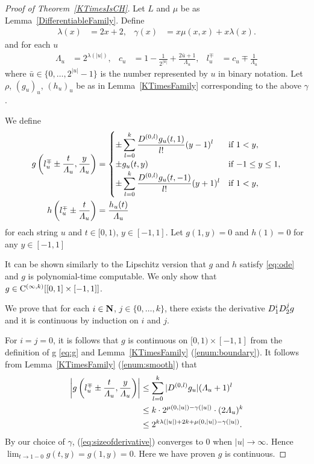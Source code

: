 \begin{proof}[Proof of Theorem~\ref{KTimesIsCH}]
Let $L$ and $\mu$ be as Lemma~\ref{DifferentiableFamily}.
Define
 \begin{align}
  \lambda(x) &= 2x + 2,&
  \gamma(x) &= x \mu(x, x) + x \lambda(x).
 \end{align}
and for each $u$
\begin{align}
 \Lambda_u 
 &= 2^{\lambda(|u|)}, &
 c_u 
 &= 1-\frac{1}{2^{|u|}}+\frac{2\bar{u}+1}{\Lambda_u}, &
 l_u^\mp 
 &= c_u\mp\frac{1}{\Lambda_u}
\end{align}  
 where $\bar u \in \{0, \dots, 2^{|u|} - 1\}$ is the number represented by $u$ in binary notation.
Let $\rho$, $(g_u)_u$, $(h_u)_u$ be as in Lemma~\ref{KTimesFamily} 
corresponding to the above $\gamma$.

We define
 \begin{align} \label{eq:g}
 g \left(l^\mp_u \pm \frac{t}{\varLambda_u}, \frac{y}{\varLambda_u}\right)
  &= \begin{cases}
      \pm \displaystyle \sum_{l=0}^k \frac{D^{(0,l)}g_u(t,1)}{l!} (y-1)^l 
      &  \text{if} \ 1<y, \\
      \pm g_u(t, y)      & \text{if} \ {-1} \le y \le 1, \\
      \pm \displaystyle \sum_{l=0}^k \frac{D^{(0,l)}g_u(t,-1)}{l!} (y+1)^l  
      &  \text{if} \ 1<y, \\
    \end{cases} 
  \\
 h \left( l^\mp_u \pm \frac{t}{\varLambda_u} \right) 
  & = \frac{h_u(t)}{\varLambda_u}
\end{align}
for each string $u$ and $t \in [0,1)$, $y \in [-1, 1]$.
Let $g(1,y) = 0$ and $h(1) = 0$ for any $y \in [-1,1]$

It can be shown similarly to the Lipschitz version 
\cite[Theorem 3.2]{kawamura2010lipschitz}
that $g$ and $h$ satisfy \eqref{eq:ode} and $g$ is polynomial-time computable.
We only show that $g \in \mathrm C^{(\infty, k)}[[0,1] \times [-1, 1]]$.

We prove that for each $i \in \mathbf N$, $j \in \{0, \dots, k\}$,
there exists the derivative $D_1^i D_2^j g$ and it is continuous
by induction on $i$ and $j$.

For $i=j=0$, it is follows that $g$ is continuous on $[0,1) \times [-1,1]$
from the definition of g \eqref{eq:g} and Lemma~\ref{KTimesFamily} (\ref{enum:boundary}).
It follows from Lemma~\ref{KTimesFamily} (\ref{enum:smooth}) that
\begin{align}
 \left|g \left(l^\mp_u \pm \frac{t}{\varLambda_u},
 \frac{y}{\varLambda_u}\right)\right|
 &\le 
 \sum^{k}_{l=0} |D^{(0,l)} g_u | (\varLambda_u + 1)^l 
 \notag
 \\
 &\le
 k \cdot 2^{\mu(0, |u|) - \gamma(|u|)} \cdot (2\varLambda_u)^k
 \notag
 \\
 & 
 \le  2^{k\lambda(|u|) + 2k + \mu(0, |u|)  - \gamma(|u|)}. 
 \label{eq:sizeofderivative}
\end{align}
By our choice of $\gamma$, 
(\ref{eq:sizeofderivative}) converges to $0$ when $|u| \to \infty$.
Hence $\lim_{t \to 1-0} g(t,y) = g(1, y) = 0$.
Here we have proven $g$ is continuous.


\end{proof}
